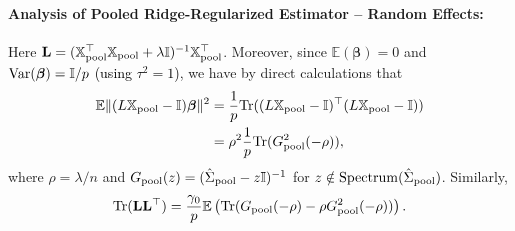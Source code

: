 \documentclass{article}
\theoremstyle{plain}
\theoremstyle{remark}
\def \bbeta{\boldsymbol{\beta}}
\def \bbeta{\boldsymbol{\beta}}
\def \Xm {\mathbb{X}_{\rm pool}}
\def \tr {\mathrm{Tr}}
\def \I{\mathcal{I}}
\def \E{\mathbb{E}}
\def \I {\mathbb{I}}
\begin{document}
\paragraph{Analysis of Pooled Ridge-Regularized Estimator -- Random Effects:} Here $\mathbf{L}=(\Xm^\top\Xm+\lambda\I)^{-1}\Xm^\top$. Moreover, since $\E(\bbeta)=0$ and $\mathrm{Var}(\bbeta)=\textcolor{black}{\I/p}$ \textcolor{black}{(using $\tau^2=1$)}, we have by direct calculations that
\begin{align*}
    \E\|(L\mathbb{X}_{\rm pool}-\I)\bbeta\|^2&=\frac{1}{p}\tr((L\mathbb{X}_{\rm pool}-\I)^\top (L\mathbb{X}_{\rm pool}-\I))\\
    &=\rho^2\frac 1p\tr (G_{\rm pool}^2(-\rho)),
\end{align*}
where $\rho=\lambda/n$ and $G_{\rm pool}(z)=(\hat{\Sigma}_{\rm pool}-z\I)^{-1}$ for $z\notin \mathrm{Spectrum}(\hat{\Sigma}_{\rm pool})$. Similarly,
\begin{align*}
   \tr(\mathbf{L}\mathbf{L}^\top)=\frac{\gamma_0}{p}\E\left(\tr(G_{\rm pool}(-\rho)-\rho G_{\rm pool}^2(-\rho))\right).
\end{align*}
\end{document}
